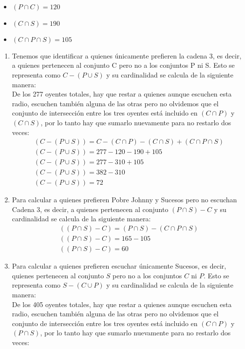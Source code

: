 \documentclass[12pt]{article}
\begin{document}
\begin{enumerate}
\begin{itemize}
            \item $(P\cap C)=120$
            \item $(C\cap S)=190$
            \item $(C\cap P \cap S)=105$
        \end{itemize}
        \begin{enumerate}
            \item Tenemos que identificar a quienes únicamente prefieren la cadena 3, es decir, a quienes pertenecen al conjunto C pero no a los conjuntos P ni S. Esto se representa como $C-(P\cup S)$ y su cardinalidad se calcula de la siguiente manera:\\
            De los 277 oyentes totales, hay que restar a quienes aunque escuchen esta radio, escuchen también alguna de las otras pero no olvidemos que el conjunto de intersección entre los tres oyentes está incluido en $(C\cap P)$ y $(C\cap S)$, por lo tanto hay que sumarlo nuevamente para no restarlo dos veces:
            \begin{gather*}
                (C-(P\cup S))=C-(C\cap P)-(C\cap S)+(C\cap P \cap S)\\
                (C-(P\cup S))=277-120-190+105\\
                (C-(P\cup S))=277-310+105\\
                (C-(P\cup S))=382-310\\
                (C-(P\cup S))=72
            \end{gather*}
            \item Para calcular a quienes prefieren Pobre Johnny y Sucesos pero no escuchan Cadena 3, es decir, a quienes pertenecen al conjunto $(P\cap S)-C$ y su cardinalidad se calcula de la siguiente manera:
            \begin{gather*}
                ((P\cap S)-C)=(P\cap S)-(C\cap P \cap S)\\
                ((P\cap S)-C)=165-105\\
                ((P\cap S)-C)=60
            \end{gather*}
            \item Para calcular a quienes prefieren escuchar únicamente Sucesos, es decir, quienes pertenecen al conjunto $S$ pero no a los conjuntos $C$ ni $P$. Esto se representa como $S-(C\cup P)$ y su cardinalidad se calcula de la siguiente manera:\\
            De los 405 oyentes totales, hay que restar a quienes aunque escuchen esta radio, escuchen también alguna de las otras pero no olvidemos que el conjunto de intersección entre los tres oyentes está incluido en $(C\cap P)$ y $(P\cap S)$, por lo tanto hay que sumarlo nuevamente para no restarlo dos veces:

\end{enumerate}
\end{enumerate}
\end{document}
